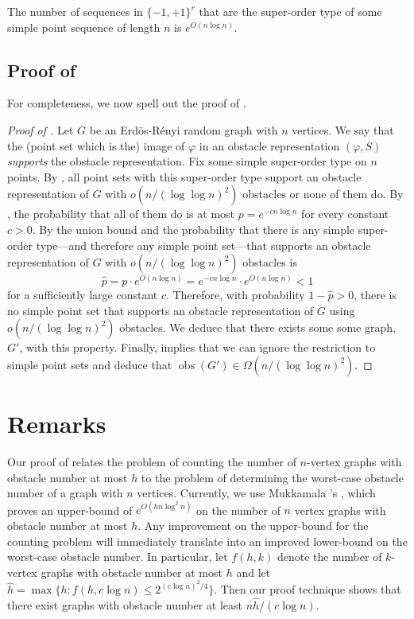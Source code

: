 \documentclass{patmorin}
\DeclareMathOperator{\obs}{obs}
\begin{document}
\begin{lem}
  The number of sequences in $\{-1,{+1}\}^{r}$ that are the super-order
  type of some simple point sequence of length $n$ is $e^{O(n\log n)}$.
\end{lem}

\subsection{Proof of }

For completeness, we now spell out the proof of .

\begin{proof}[Proof of ]
  Let $G$ be an Erd\"os-R\'enyi random graph with $n$ vertices.
  We say that the (point set which is the) image of $\varphi$ in an
  obstacle representation $(\varphi, S)$ \emph{supports} the obstacle
  representation.  Fix some simple super-order type on $n$ points.
  By , all point sets with this super-order type
  support an obstacle representation of $G$ with $o(n/(\log\log n)^2)$
  obstacles or none of them do.  By , the probability that
  all of them do is at most $p=e^{-cn\log n}$ for every constant $c>0$.
  By the union bound and  the probability
  that there is any simple super-order type---and therefore any simple
  point set---that supports an obstacle representation of $G$ with
  $o(n/(\log\log n)^2)$ obstacles is
  \[
     \hat p = p\cdot e^{O(n\log n)} = e^{-cn\log n}\cdot e^{O(n\log n)} < 1
  \]
  for a sufficiently large constant $c$.  Therefore, with probability
  $1-\hat p > 0$, there is no simple point set that supports an obstacle
  representation of $G$ using $o(n/(\log\log n)^2)$ obstacles. We deduce
  that there exists some some graph, $G'$, with this property.  Finally,
   implies that we can ignore the restriction to simple
  point sets and deduce that $\obs(G')\in \Omega(n/(\log\log n)^2)$.
\end{proof}


\section{Remarks}

Our proof of  relates the problem of counting the number
of $n$-vertex graphs with obstacle number at most $h$ to the problem of
determining the worst-case obstacle number of a graph with $n$ vertices.
Currently, we use Mukkamala \etal's , which proves an
upper-bound of $e^{O(hn\log^2 n)}$ on the number of $n$ vertex graphs with
obstacle number at most $h$.  Any improvement on the upper-bound for the
counting problem will immediately translate into an improved lower-bound
on the worst-case obstacle number.  In particular, let $f(h,k)$ denote
the number of $k$-vertex graphs with obstacle number at most $h$ and
let $\hat h = \max\{h:f(h,c\log n) \le 2^{(c\log n)^2/4}\}$.  Then our
proof technique shows that there exist graphs with obstacle number at
least $n\hat h/(c\log n)$.
\end{document}
